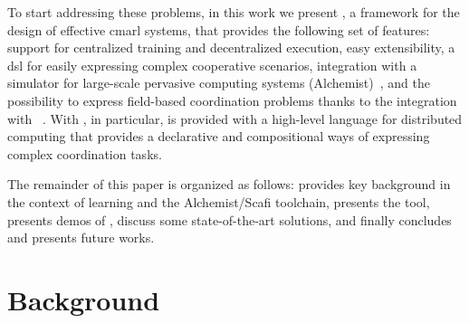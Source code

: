 To start addressing these problems, in this work we present \scarlib{}, a framework for the design of effective \ac{cmarl} systems, that 
 provides the following set of features:
 support for centralized training and decentralized execution, 
 easy extensibility, 
 a \ac{dsl} for easily expressing complex cooperative scenarios, 
 integration with a simulator for large-scale pervasive computing systems (Alchemist)~\cite{DBLP:journals/jos/PianiniMV13},
 and the possibility to express field-based coordination problems thanks to the integration with \scafi{}~\cite{Casadei2022}.
%
With \scafi{}, in particular, \scarlib{} is provided with a high-level language for distributed computing that provides a declarative
 and compositional ways of expressing complex coordination tasks. 

The remainder of this paper is organized as follows:  provides key background in the context of learning and the Alchemist/Scafi toolchain,  presents the \scarlib{} tool,  presents demos of \scarlib{},  discuss some state-of-the-art solutions, and finally  concludes and presents future works.
%
\section{Background}\label{background} %

